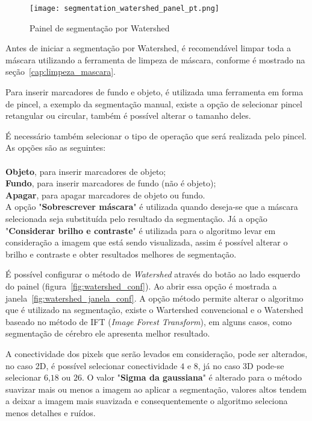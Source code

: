 \begin{figure}[!htb]
\centering
\texttt{[image: segmentation\_watershed\_panel\_pt.png]}
\caption{Painel de segmentação por Watershed}
\label{fig:watershed_painel}
\end{figure}

Antes de iniciar a segmentação por Watershed, é recomendável limpar toda a máscara utilizando a ferramenta de limpeza de máscara, conforme é mostrado na seção~\ref{cap:limpeza_mascara}.

Para inserir marcadores de fundo e objeto, é utilizada uma ferramenta em forma de pincel, a exemplo da segmentação manual, existe a opção de selecionar pincel retangular ou circular, também é possível alterar o tamanho deles. 

É necessário também selecionar o tipo de operação que será realizada pelo pincel. As opções são as
seguintes:\\
\\
\textbf{Objeto}, para inserir marcadores de objeto;\\
\textbf{Fundo}, para inserir marcadores de fundo (não é objeto);\\
\textbf{Apagar}, para apagar marcadores de objeto ou fundo.\\

A opção "\textbf{Sobrescrever máscara}" é utilizada quando deseja-se que a máscara selecionada seja substituída pelo resultado da segmentação. Já a opção "\textbf{Considerar brilho e contraste}" é utilizada para o algoritmo levar em consideração a imagem que está sendo visualizada, assim é possível alterar o brilho e contraste e obter resultados melhores de segmentação.

É possível configurar o método de \textit{Watershed} através do botão ao lado esquerdo do painel (figura~\ref{fig:watershed_conf}). Ao abrir essa opção é mostrada a janela~\ref{fig:watershed_janela_conf}. A opção método permite alterar o algoritmo que é utilizado na segmentação, existe o Wartershed convencional e o Watershed baseado no método de IFT (\textit{Image Forest Transform}), em alguns casos, como segmentação de cérebro ele apresenta melhor resultado.

A conectividade dos pixels que serão levados em consideração, pode ser alterados, no caso 2D, é possível selecionar conectividade $4$ e $8$, já no caso 3D pode-se selecionar $6$,$18$ ou $26$. O valor "\textbf{Sigma da gaussiana}" é alterado para o método suavizar mais ou menos a imagem ao aplicar a segmentação, valores altos tendem a deixar a imagem mais suavizada e consequentemente o algoritmo seleciona menos detalhes e ruídos.

